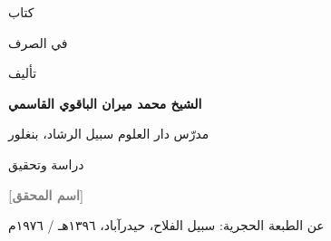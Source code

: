 \thispagestyle{frontframe}
\begin{center}
\vspace*{2mm}
{\large كتاب\par}
\vspace{4mm}
\scalebox{0.95}{\wafiyahtitle}\par
\vspace{5mm}
{\large في الصرف\par}
\vspace{7mm}
{\normalsize تأليف\par}
\vspace{2mm}
{\Large\bfseries الشيخ محمد ميران الباقوي القاسمي\par}
\vspace{1mm}
{\small مدرّس دار العلوم سبيل الرشاد، بنغلور\par}
\vspace{7mm}
\ornament\par
\vspace{7mm}
{\normalsize دراسة وتحقيق\par}
\vspace{2mm}
{\Large\bfseries\textcolor{gray}{[اسم المحقق]}\par}
\vfill
{\small عن الطبعة الحجرية: سبيل الفلاح، حيدرآباد، ١٣٩٦هـ / ١٩٧٦م\par}
\end{center}
\clearpage

